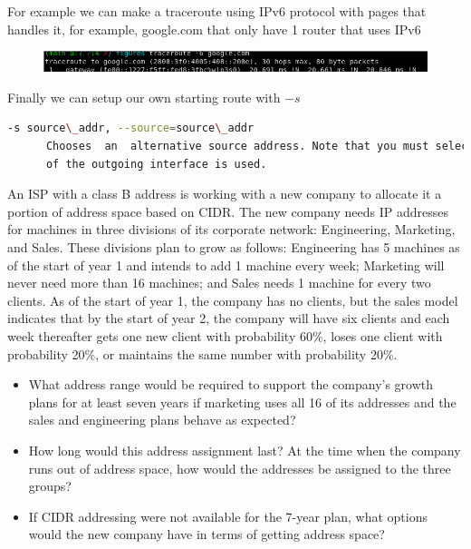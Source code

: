 \documentclass{assignment}
\begin{document}
\vspace{1cm}
For example we can make a traceroute using IPv6 protocol with pages
that handles it, for example, google.com that only have 1 router that uses IPv6
\begin{figure}[h]
\begin{center}
  \includegraphics[scale=0.5]{figures/2_005.png}
\end{center}
\label{fig:Google IPv6 tracerouting}
\end{figure}

Finally we can setup our own starting route with $-s$

\begin{lstlisting}[language=bash]
-s source\_addr, --source=source\_addr
      Chooses  an  alternative source address. Note that you must select the address of one of the interfaces.  By default, the address
      of the outgoing interface is used.
\end{lstlisting}
\newpage
\begin{ex}
  An ISP with a class B address is working with a new company to allocate it a portion of
address space based on CIDR. The new company needs IP addresses for machines in three
divisions of its corporate network: Engineering, Marketing, and Sales. These divisions plan to
grow as follows: Engineering has 5 machines as of the start of year 1 and intends to add 1
machine every week; Marketing will never need more than 16 machines; and Sales needs 1
machine for every two clients. As of the start of year 1, the company has no clients, but the
sales model indicates that by the start of year 2, the company will have six clients and each
week thereafter gets one new client with probability 60\%, loses one client with
probability 20\%,
or maintains the same number with probability 20\%.
\begin{itemize}
\item What address range would be required to support the company’s growth plans for at least
seven years if marketing uses all 16 of its addresses and the sales and engineering plans
behave as expected?
\item How long would this address assignment last? At the time when the company runs out of
address space, how would the addresses be assigned to the three groups?
\item If CIDR addressing were not available for the 7-year plan, what options would the new
company have in terms of getting address space?
\end{itemize}
\end{ex}
\end{document}
